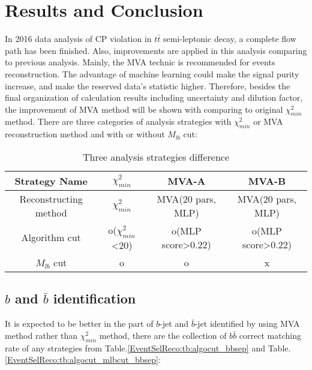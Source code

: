 

\section{Results and Conclusion}
\label{sec:Result}

	In 2016 data analysis of CP violation in $t\bar{t}$ semi-leptonic decay, a complete flow path has been finished. Also, improvements are applied in this analysis comparing to previous analysis. Mainly, the MVA technic is recommended for events reconstruction. The advantage of machine learning could make the signal purity increase, and make the reserved data's statistic higher. Therefore, besides the final organization of calculation results including uncertainty and dilution factor, the improvement of MVA method will be shown with comparing to original $\chi^2_{min}$ method. There are three categories of analysis strategies with $\chi^2_{min}$ or MVA reconstruction method and with or without $M_{lb}$ cut:


	\begin{center}
	\setlength{\tabcolsep}{12pt}
	\begin{longtable}{ | c | c c c | }
	\caption{Three analysis strategies difference} \\
	\hline
	Strategy Name & $\chi^2_{min}$ & MVA-A & MVA-B \\ 
	\hline
	Reconstructing method & $\chi^2_{min}$ & MVA(20 pars, MLP) & MVA(20 pars, MLP) \\ 
	Algorithm cut & o($\chi^2_{min}$<20) & o(MLP score>0.22) & o(MLP score>0.22) \\
	$M_{lb}$ cut & o & o & x \\
	\hline
	\end{longtable}
	\end{center}

	\subsection{$b$ and $\bar{b}$ identification}
	\label{ssec:Result_bbid}
		It is expected to be better in the part of $b$-jet and $\bar{b}$-jet identified by using MVA method rather than $\chi^2_{min}$ method, there are the collection of $b\bar{b}$ correct matching rate of any strategies from Table.\ref{EventSelReco:tb:algocut_bbsep} and Table.\ref{EventSelReco:tb:algocut_mlbcut_bbsep}:
		
